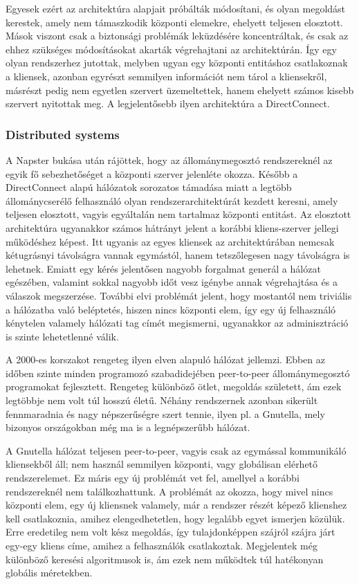 \documentclass[a4paper]{article}
\begin{document}
Egyesek ezért az architektúra alapjait próbálták módosítani, és olyan megoldást kerestek, amely nem támaszkodik központi elemekre, ehelyett teljesen elosztott. Mások viszont csak a biztonsági problémák leküzdésére koncentráltak, és csak az ehhez szükséges módosításokat akarták végrehajtani az architektúrán. Így egy olyan rendszerhez jutottak, melyben ugyan egy központi entitáshoz csatlakoznak a kliensek, azonban egyrészt semmilyen információt nem tárol a kliensekről, másrészt pedig nem egyetlen szervert üzemeltettek, hanem ehelyett számos kisebb szervert nyitottak meg. A legjelentősebb ilyen architektúra a DirectConnect. 

\subsubsection{Distributed systems}

A Napster bukása után rájöttek, hogy az állománymegosztó rendszereknél az egyik fő sebezhetőséget a központi szerver jelenléte okozza. Később a DirectConnect alapú hálózatok sorozatos támadása miatt a legtöbb állománycserélő felhasználó olyan rendszerarchitektúrát kezdett keresni, amely teljesen elosztott, vagyis egyáltalán nem tartalmaz központi entitást. Az elosztott architektúra ugyanakkor számos hátrányt jelent a korábbi kliens-szerver jellegi működéshez képest. Itt ugyanis az egyes kliensek az architektúrában nemcsak kétugrásnyi távolságra vannak egymástól, hanem tetszőlegesen nagy távolságra is lehetnek. Emiatt egy kérés jelentősen nagyobb forgalmat generál a hálózat egészében, valamint sokkal nagyobb időt vesz igénybe annak végrehajtása és a válaszok megszerzése. További elvi problémát jelent, hogy mostantól nem triviális a hálózatba való beléptetés, hiszen nincs központi elem, így egy új felhasználó kénytelen valamely hálózati tag címét megismerni, ugyanakkor az adminisztráció is szinte lehetetlenné válik.

A 2000-es korszakot rengeteg ilyen elven alapuló hálózat jellemzi. Ebben az időben szinte minden programozó szabadidejében peer-to-peer állománymegosztó programokat fejlesztett. Rengeteg különböző ötlet, megoldás született, ám ezek legtöbbje nem volt túl hosszú életű. Néhány rendszernek azonban sikerült fennmaradnia és nagy népszerűségre szert tennie, ilyen pl. a Gnutella, mely bizonyos országokban még ma is a legnépszerűbb hálózat.

A Gnutella hálózat teljesen peer-to-peer, vagyis csak az egymással kommunikáló kliensekből áll; nem használ semmilyen központi, vagy globálisan elérhető rendszerelemet. Ez máris egy új problémát vet fel, amellyel a korábbi rendszereknél nem találkozhattunk. A problémát az okozza, hogy mivel nincs központi elem, egy új kliensnek valamely, már a rendszer részét képező klienshez kell csatlakoznia, amihez elengedhetetlen, hogy legalább egyet ismerjen közülük. Erre eredetileg nem volt kész megoldás, így tulajdonképpen szájról szájra járt egy-egy kliens címe, amihez a felhasználók csatlakoztak. Megjelentek még különböző keresési algoritmusok is, ám ezek nem működtek túl hatékonyan globális méretekben.
\end{document}
